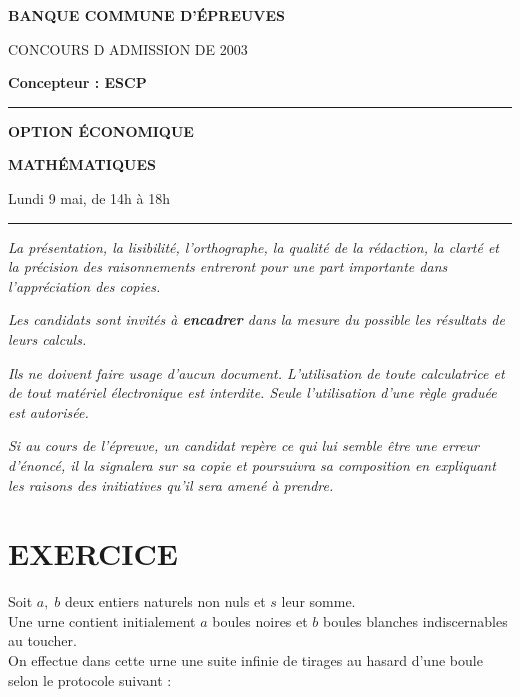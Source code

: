 \documentclass[11pt]{article}%
\begin{document}

\begin{center}
{\LARG\E\textbf{BANQUE COMMUNE D'ÉPREUVES}}



{\large \textsc{CONCOURS D ADMISSION DE 2003}}



{\large \textbf{Concepteur : ESCP}}



\rule{2.39cm}{0.05cm}



{\Large \textbf{OPTION ÉCONOMIQUE}}



{\Large \textbf{MATHÉMATIQUES }}



{\Large Lundi 9 mai, de 14h à 18h}



\rule{2.39cm}{0.05cm}
\end{center}

\textit{La présentation, la lisibilité, l'orthographe, la qualité
de la rédaction, la clarté et la précision des raisonnements
entreront pour une part importante dans l'appréciation des copies.}

\textit{Les candidats sont invités à \textbf{encadrer} dans la mesure
du possible les résultats de leurs calculs.}

\textit{Ils ne doivent faire usage d'aucun document. L'utilisation de
toute
calculatrice et de tout matériel électronique est interdite. Seule
l'utilisation d'une règle graduée est autorisée.}

\textit{Si au cours de l'épreuve, un candidat repère ce qui lui semble
être une erreur d'énoncé, il la signalera sur sa copie et
poursuivra sa composition en expliquant les raisons des initiatives
qu'il sera
amené à prendre.}

\vspace*{3cm}

\section*{EXERCICE}

Soit $a,\;b$ deux entiers naturels non nuls et $s$ leur somme.\\
Une urne contient initialement $a$ boules noires et $b$ boules blanches
indiscernables au toucher.\\
On effectue dans cette urne une suite infinie de tirages au hasard
d'une
boule selon le protocole suivant :
\end{document}
